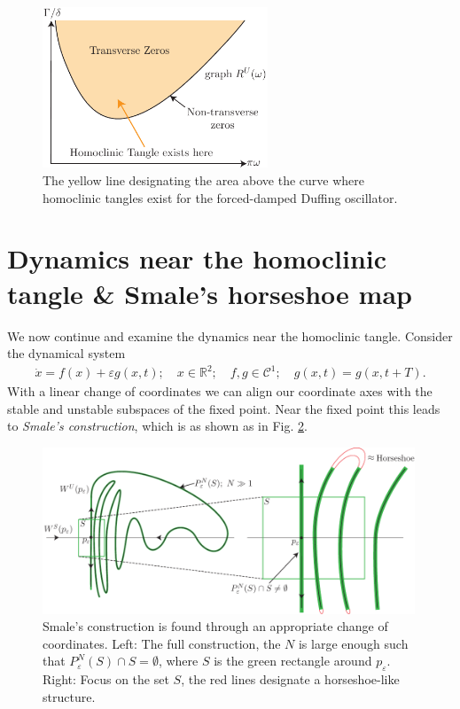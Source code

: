 \begin{ex}
\begin{figure}[h!]
	\centering
	\includegraphics[width=0.6\textwidth]{figures/ch6/15beam_tangle.pdf}
	\caption{The yellow line designating the area above the curve where homoclinic tangles exist for the forced-damped Duffing oscillator.}
	\label{fig:beam_tangle}
\end{figure}
\end{ex}

\section{Dynamics near the homoclinic tangle \& Smale's horseshoe map}
We now continue and examine the dynamics near the homoclinic tangle. Consider the dynamical system
\begin{align}
	\dot{x} = f(x) + \varepsilon g(x,t);\quad x \in \mathbb{R}^{2};\quad f,g \in  \mathcal{C}^{1};\quad g(x,t) = g(x,t+T).
\end{align}
With a linear change of coordinates we can  align our coordinate axes with the stable and unstable subspaces of the fixed point. Near the fixed point this leads to \emph{Smale's construction}, which is as shown as in Fig. \ref{fig:smales_construction}.
\begin{figure}[h!]
	\centering
	\includegraphics[width=0.99\textwidth]{figures/ch6/16smales_construction.pdf}
	\caption{Smale's construction is found through an appropriate change of coordinates. Left: The full construction, the $N$ is large enough such that $P^{N}_{\varepsilon}(S)\cap S = \emptyset$, where $S$ is the green rectangle around $p_{\varepsilon}$. Right: Focus on the set $S$, the red lines designate a horseshoe-like structure.}
	\label{fig:smales_construction}
\end{figure}

